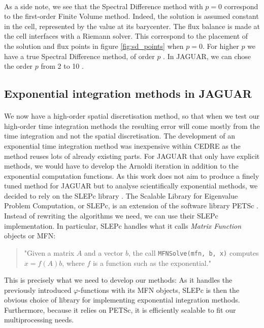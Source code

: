       \paragraph{}
      As a side note, we see that the Spectral Difference method with $p = 0$ correspond to the first-order Finite Volume method.
      Indeed, the solution is assumed constant in the cell, represented by the value at its barycenter.
      The flux balance is made at the cell interfaces with a Riemann solver.
      This correspond to the placement of the solution and flux points in figure \ref{fig:sd_points} when $p = 0$.
      For higher $p$ we have a true Spectral Difference method, of order $p$ .
      In JAGUAR, we can chose the order $p$ from 2 to 10 .


    \subsection{Exponential integration methods in JAGUAR}

      \paragraph{}
      We now have a high-order spatial discretisation method, so that when we test our high-order time integration methods the resulting error will come mostly from the time integration and not the spatial discretisation.
      The development of an exponential time integration method was inexpensive within CEDRE as the method reuses lots of already existing parts.
      For JAGUAR that only have explicit methods, we would have to develop the Arnoldi iteration in addition to the exponential computation functions.
      As this work does not aim to produce a finely tuned method for JAGUAR but to analyse scientifically exponential methods, we decided to rely on the SLEPc library \cite{HernandezRomanVidal2005}.
      The Scalable Library for Eigenvalue Problem Computation, or SLEPc, is an extension of the software library PETSc \cite{petsc-web-page,petsc-user-ref,petsc-efficient}.
      Instead of rewriting the algorithms we need, we can use their SLEPc implementation.
      In particular, SLEPc handles what it calls \emph{Matrix Function} objects or MFN:
      \begin{quote}
        "Given a matrix $A$ and a vector $b$, the call \texttt{MFNSolve(mfn, b, x)} computes \\
        $x=f\left(A\right) b$, where $f$ is a function such as the exponential."
      \end{quote}
      This is precisely what we need to develop our methods:
      As it handles the previously introduced $\varphi$-functions with its MFN objects, SLEPc is then the obvious choice of library for implementing exponential integration methods.
      Furthermore, because it relies on PETSc, it is efficiently scalable to fit our multiprocessing needs.

